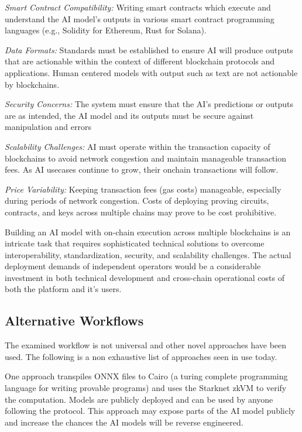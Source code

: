 \documentclass[conference]{IEEEtran}
\begin{document}
\textit{Smart Contract Compatibility:} Writing smart contracts which execute and understand the AI model’s outputs in various smart contract programming languages (e.g., Solidity for Ethereum, Rust for Solana).

\textit{Data Formats:} Standards must be established to ensure AI will produce outputs that are actionable within the context of different blockchain protocols and applications. Human centered models with output such as text are not actionable by blockchains.

\textit{Security Concerns:} The system must ensure that the AI’s predictions or outputs are as intended, the AI model and its outputs must be secure against manipulation and errors

\textit{Scalability Challenges:} AI must operate within the transaction capacity of blockchains to avoid network congestion and maintain manageable transaction fees. As AI usecases continue to grow, their onchain transactions will follow.

\textit{Price Variability:} Keeping transaction fees (gas costs) manageable, especially during periods of network congestion.  Costs of deploying proving circuits, contracts, and keys across multiple chains may prove to be cost prohibitive.

Building an AI model with on-chain execution across multiple blockchains is an intricate task that requires sophisticated technical solutions to overcome interoperability, standardization, security, and scalability challenges. The actual deployment demands of independent operators would be a considerable investment in both technical development and cross-chain operational costs of both the platform and it’s users.

\subsection{Alternative Workflows}
The examined workflow is not universal and other novel approaches have been used. The following is a non exhaustive list of approaches seen in use today.

One approach transpiles ONNX files to Cairo (a turing complete programming language for writing provable programs) and uses the Starknet zkVM to verify the computation. Models are publicly deployed and can be used by anyone following the protocol. This approach may expose parts of the AI model publicly and increase the chances the AI models will be reverse engineered.
\end{document}
